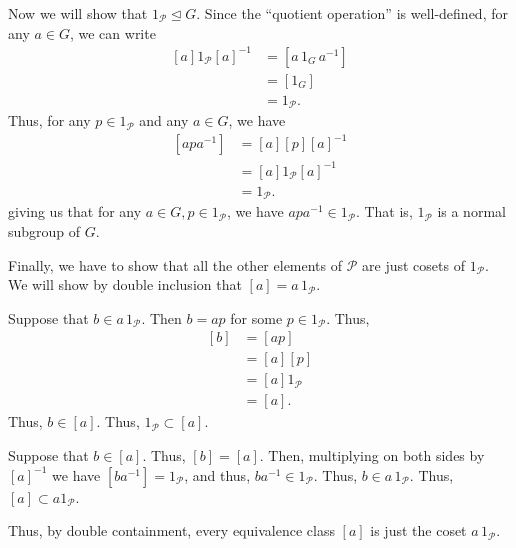 \documentclass[12 pt, letterpaper]{hmcpset}
\begin{document}
\begin{solution}
	Now we will show that $1_{\mathcal{P}} \trianglelefteq G$. Since the ``quotient operation'' is well-defined, for any $a \in G$, we can write
	\[
		\begin{split}
			[a] 1_{\mathcal{P}} [a]^{-1} & = [a \, 1_{G} \, a^{-1}] \\
					   & = [1_{G}] \\
					   & = 1_{\mathcal{P}}.
		\end{split}
	\]
	Thus, for any $p \in 1_{\mathcal{P}}$ and any $a \in G$, we have
	\[
		\begin{split}
			[apa^{-1}] & = [a][p][a]^{-1} \\ 
			   & = [a] 1_{\mathcal{P}} [a]^{-1} \\
			   & = 1_{\mathcal{P}}.
		\end{split}
	\]
	giving us that for any $a \in G, p \in 1_{\mathcal{P}}$, we have $apa^{-1} \in 1_{\mathcal{P}}$. That is, $1_{\mathcal{P}}$ is a normal subgroup of $G$. 

	Finally, we have to show that all the other elements of $\mathcal{P}$ are just cosets of $1_{\mathcal{P}}$. We will show by double inclusion that $[a] = a \, 1_{\mathcal{P}}$. 

	Suppose that $b \in a \, 1_{\mathcal{P}}$. Then $b = a p$ for some $p \in 1_{\mathcal{P}}$. Thus,
	\[
		\begin{split}
			[b] & = [ap] \\
			    & = [a][p] \\
			    & = [a] 1_{\mathcal{P}} \\
			    & = [a].
		\end{split}
	\]
	Thus, $b \in [a]$. Thus, $1_{\mathcal{P}} \subset [a]$. 

	Suppose that $b \in [a]$. Thus, $[b] = [a]$. Then, multiplying on both sides by $[a]^{-1}$ we have $[ba^{-1}] = 1_{\mathcal{P}}$, and thus, $ba^{-1} \in 1_{\mathcal{P}}$. Thus, $b \in a \, 1_{\mathcal{P}}$. Thus, $[a] \subset a 1_{\mathcal{P}}$. 

	Thus, by double containment, every equivalence class $[a]$ is just the coset $a \, 1_{\mathcal{P}}$.
\end{solution}
\end{document}
